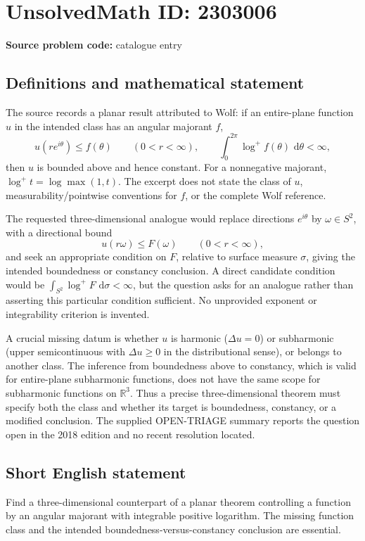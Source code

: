 \documentclass[11pt]{article}
\newcommand{\R}{\mathbb{R}}
\newcommand{\dd}{\,\mathrm{d}}
\begin{document}
\section*{UnsolvedMath ID: 2303006}
\textbf{Source problem code:} catalogue entry
\subsection{Definitions and mathematical statement}
The source records a planar result attributed to Wolf: if an entire-plane function \(u\) in the intended class has an angular majorant \(f\),
\[
u(re^{i\theta})\le f(\theta)\qquad(0<r<\infty),
\qquad
\int_0^{2\pi}\log^+f(\theta)\,\dd\theta<\infty,
\]
then \(u\) is bounded above and hence constant. For a nonnegative majorant, \(\log^+t=\log\max(1,t)\). The excerpt does not state the class of \(u\), measurability/pointwise conventions for \(f\), or the complete Wolf reference.

The requested three-dimensional analogue would replace directions \(e^{i\theta}\) by \(\omega\in S^2\), with a directional bound
\[
u(r\omega)\le F(\omega)\qquad(0<r<\infty),
\]
and seek an appropriate condition on \(F\), relative to surface measure \(\sigma\), giving the intended boundedness or constancy conclusion. A direct candidate condition would be \(\int_{S^2}\log^+F\,\dd\sigma<\infty\), but the question asks for an analogue rather than asserting this particular condition sufficient. No unprovided exponent or integrability criterion is invented.

A crucial missing datum is whether \(u\) is harmonic (\(\Delta u=0\)) or subharmonic (upper semicontinuous with \(\Delta u\ge0\) in the distributional sense), or belongs to another class. The inference from boundedness above to constancy, which is valid for entire-plane subharmonic functions, does not have the same scope for subharmonic functions on \(\R^3\). Thus a precise three-dimensional theorem must specify both the class and whether its target is boundedness, constancy, or a modified conclusion. The supplied OPEN-TRIAGE summary reports the question open in the 2018 edition and no recent resolution located.
\subsection{Short English statement}
Find a three-dimensional counterpart of a planar theorem controlling a function by an angular majorant with integrable positive logarithm. The missing function class and the intended boundedness-versus-constancy conclusion are essential.
\end{document}
